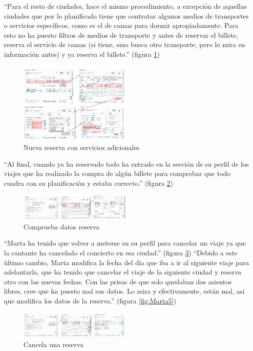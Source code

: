“Para el resto de ciudades, hace el mismo procedimiento, a excepción de aquellas ciudades que por lo planificado tiene que contratar algunos medios de transportes 
o servicios específicos, como es el de camas para dormir apropiadamente. Para esto no ha puesto filtros de medios de transporte y antes de reservar el billete, 
reserva el servicio de camas (si tiene, sino busca otro transporte, pero lo mira en información antes) y ya reserva el billete.” (figura \ref{fig:Marta2})
\begin{figure}[h]
    \centering
    \includegraphics[width=0.5\textwidth]{Imagenes/Keypath/Marta2.png}
    \caption{Nueva reserva con servicios adicionales}
    \label{fig:Marta2}
\end{figure}

“Al final, cuando ya ha reservado todo ha entrado en la sección de su perfil de los viajes que ha realizado la compra de algún billete para comprobar que todo 
cuadra con su planificación y estaba correcto.” (figura \ref{fig:Marta3})
\begin{figure}[h]
    \centering
    \includegraphics[width=0.5\textwidth]{Imagenes/Keypath/Marta3.png}
    \caption{Comprueba datos reserva}
    \label{fig:Marta3}
\end{figure}

“Marta ha tenido que volver a meterse en su perfil para cancelar un viaje ya que la cantante ha cancelado el concierto en esa ciudad.” (figura \ref{fig:Marta4}) “Debido 
a este último cambio, Marta modifica la fecha del día que iba a ir al siguiente viaje para adelantarla, que ha tenido que cancelar el viaje de la siguiente ciudad 
y reserva otro con las nuevas fechas. Con las prisas de que solo quedaban dos asientos libres, cree que ha puesto mal sus datos. Lo mira y efectivamente, 
están mal, así que modifica los datos de la reserva.” (figura \ref{fig:Marta5})
\begin{figure}[h]
    \centering
    \includegraphics[width=0.5\textwidth]{Imagenes/Keypath/Marta4.png}
    \caption{Cancela una reserva}
    \label{fig:Marta4}
\end{figure}

